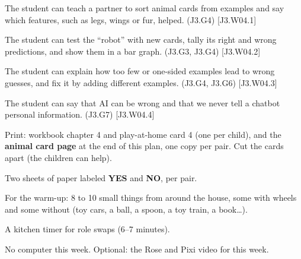 
\begin{objectives}
  \item The student can teach a partner to sort animal cards from examples and say which features, such as legs, wings or fur, helped. (J3.G4) [J3.W04.1]
  \item The student can test the \enquote{robot} with new cards, tally its right and wrong predictions, and show them in a bar graph. (J3.G3, J3.G4) [J3.W04.2]
  \item The student can explain how too few or one-sided examples lead to wrong guesses, and fix it by adding different examples. (J3.G4, J3.G6) [J3.W04.3]
  \item The student can say that AI can be wrong and that we never tell a chatbot personal information. (J3.G7) [J3.W04.4]
\end{objectives}

\begin{materials}
  \item Print: workbook chapter 4 and play-at-home card 4 (one per child), and the \textbf{animal card page} at the end of this plan, one copy per pair. Cut the cards apart (the children can help).
  \item Two sheets of paper labeled \textbf{YES} and \textbf{NO}, per pair.
  \item For the warm-up: 8 to 10 small things from around the house, some with wheels and some without (toy cars, a ball, a spoon, a toy train, a book\ldots).
  \item A kitchen timer for role swaps (6--7 minutes).
  \item No computer this week. Optional: the Rose and Pixi video for this week.
\end{materials}

